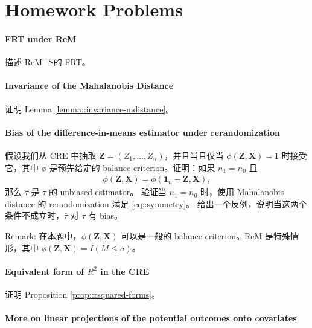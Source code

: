 \section{Homework Problems}

\paragraph{FRT under ReM}\label{hw::FRT-under-REM}

描述 ReM 下的 FRT。

\paragraph{Invariance of the Mahalanobis Distance}\label{para::invariance-M}

证明 Lemma \ref{lemma::invariance-mdistance}。

\paragraph{Bias of the difference-in-means estimator under rerandomization}\label{hw::unbiasednessof-tauhat-rerandom}

假设我们从 CRE 中抽取 $\boldsymbol{Z} = (Z_1, \ldots, Z_n)$，并且当且仅当 $\phi(\boldsymbol{Z}, \boldsymbol{X}) = 1$ 时接受它，其中 $\phi$ 是预先给定的 balance criterion。证明：如果 $n_1 = n_0$ 且
\begin{eqnarray}
\phi(\boldsymbol{Z}, \boldsymbol{X}) = \phi(\boldsymbol{1}_n-\boldsymbol{Z}, \boldsymbol{X}), \label{eq::symmetry}
\end{eqnarray}
那么 $\hat{\tau}$ 是 $\tau$ 的 unbiased estimator。
验证当 $n_1 = n_0$ 时，使用 Mahalanobis distance 的 rerandomization 满足 \eqref{eq::symmetry}。
给出一个反例，说明当这两个条件不成立时，$\hat{\tau}$ 对 $\tau$ 有 bias。

Remark: 在本题中，$\phi(\boldsymbol{Z}, \boldsymbol{X}) $ 可以是一般的 balance criterion。ReM 是特殊情形，其中 $\phi(\boldsymbol{Z}, \boldsymbol{X})  =  I(M\leq a) $。

\paragraph{Equivalent form of $R^2$ in the CRE}\label{para::r2-cre}

证明 Proposition \ref{prop::rsquared-forms}。

\paragraph{More on linear projections of the potential outcomes onto covariates}\label{hw::projection-po-onto-x}


